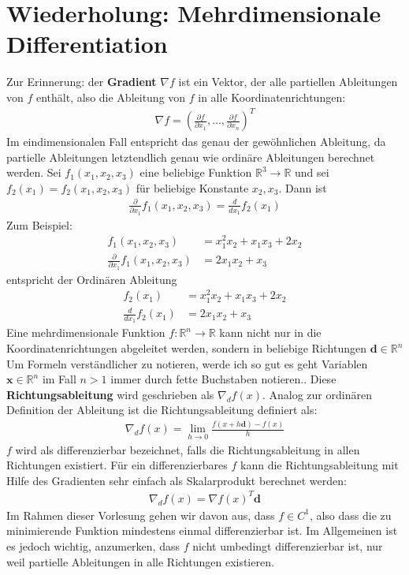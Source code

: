 \documentclass{report}
\newcommand{\tbf}{\textbf}
\newcommand{\pd}[2]{\frac{\partial #1}{\partial #2}}
\begin{document}
\section{Wiederholung: Mehrdimensionale Differentiation}
Zur Erinnerung: der \tbf{Gradient} $\nabla f$ ist ein Vektor, der alle partiellen Ableitungen von $f$ enthält, also die Ableitung von $f$ in alle Koordinatenrichtungen:
\begin{align*}
 \nabla f = \left(\pd{f}{x_1}, \hdots, \pd{f}{x_n}\right)^T
\end{align*}
Im eindimensionalen Fall entspricht das genau der gewöhnlichen Ableitung, da partielle Ableitungen letztendlich genau wie ordinäre Ableitungen berechnet werden. Sei $f_1(x_1, x_2, x_3)$ eine beliebige Funktion $\mathbb{R}^3 \to \mathbb{R}$ und sei $f_2(x_1) = f_2(x_1, x_2, x_3)$ für beliebige Konstante $x_2,x_3$. Dann ist
\begin{align*}
 \pd{}{x_1}f_1(x_1,x_2,x_3) = \frac{d}{dx_1} f_2(x_1)
\end{align*}
Zum Beispiel:
\begin{align*}
 f_1(x_1,x_2,x_3) &= x_1^2x_2 + x_1 x_3 + 2x_2\\
  \pd{}{x_1}f_1(x_1,x_2,x_3) &= 2x_1 x_2 + x_3
\end{align*}
entspricht der Ordinären Ableitung
\begin{align*}
f_2(x_1) &= x_1^2 x_2 + x_1 x_3 + 2x_2\\
\frac{d}{dx_1} f_2(x_1) &= 2x_1 x_2 + x_3
\end{align*}
Eine mehrdimensionale Funktion $f: \mathbb{R}^n \to \mathbb{R}$ kann nicht nur in die Koordinatenrichtungen abgeleitet werden, sondern in beliebige Richtungen $\bm{d} \in \mathbb{R}^n$
    {Um Formeln verständlicher zu notieren, werde ich so gut es geht Variablen $\bm{x} \in \mathbb{R}^n$ im Fall $n > 1$ immer durch fette Buchstaben notieren.}.
Diese \tbf{Richtungsableitung} wird geschrieben als $\nabla_d f(x)$. Analog zur ordinären Definition der Ableitung ist die Richtungsableitung definiert als:
\begin{align*}
 \nabla_d f(x) = \lim_{h \to 0}\frac{f(x + h\bm{d}) - f(x)}{h}
\end{align*}
$f$ wird als differenzierbar bezeichnet, falls die Richtungsableitung in allen Richtungen existiert. Für ein differenzierbares $f$ kann die Richtungsableitung mit Hilfe des Gradienten sehr einfach als Skalarprodukt berechnet werden:
\begin{align*}
 \nabla_d f(x) = \nabla f(x)^T \bm{d}
\end{align*}
Im Rahmen dieser Vorlesung gehen wir davon aus, dass $f \in C^1$, also dass die zu minimierende Funktion mindestens einmal differenzierbar ist. Im Allgemeinen ist es jedoch wichtig, anzumerken, dass $f$ nicht umbedingt differenzierbar ist, nur weil partielle Ableitungen in alle Richtungen existieren.
%
\end{document}
